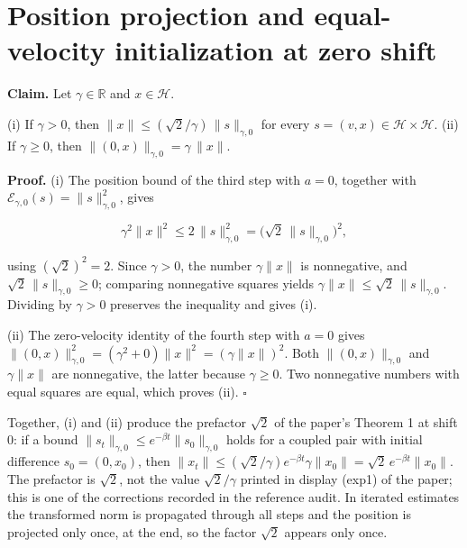 \documentclass[11pt,a4paper]{article}
\begin{document}
\section{\texorpdfstring{Position projection and equal-velocity initialization at zero shift}{Position projection and equal-velocity initialization at zero shift}}


\textbf{Claim.} Let \(\gamma\in\mathbb R\) and \(x\in \mathcal H\).




(i) If \(\gamma>0\), then \(\|x\|\le(\sqrt2/\gamma)\,\|s\|_{\gamma,0}\) for every \(s=(v,x)\in \mathcal H\times \mathcal H\).
(ii) If \(\gamma\ge0\), then \(\|(0,x)\|_{\gamma,0}=\gamma\,\|x\|\).




\textbf{Proof.} (i) The position bound of the third step with \(a=0\), together with \(\mathcal E_{\gamma,0}(s)=\|s\|_{\gamma,0}^2\), gives


\[\gamma^2\|x\|^2\le2\,\|s\|_{\gamma,0}^2=\bigl(\sqrt2\,\|s\|_{\gamma,0}\bigr)^2,\]


using \((\sqrt2)^2=2\). Since \(\gamma>0\), the number \(\gamma\|x\|\) is nonnegative, and \(\sqrt2\,\|s\|_{\gamma,0}\ge0\); comparing nonnegative squares yields \(\gamma\|x\|\le\sqrt2\,\|s\|_{\gamma,0}\). Dividing by \(\gamma>0\) preserves the inequality and gives (i).




(ii) The zero-velocity identity of the fourth step with \(a=0\) gives \(\|(0,x)\|_{\gamma,0}^2=(\gamma^2+0)\|x\|^2=(\gamma\|x\|)^2\). Both \(\|(0,x)\|_{\gamma,0}\) and \(\gamma\|x\|\) are nonnegative, the latter because \(\gamma\ge0\). Two nonnegative numbers with equal squares are equal, which proves (ii). \(\square\)




Together, (i) and (ii) produce the prefactor \(\sqrt2\) of the paper's Theorem 1 at shift \(0\): if a bound \(\|s_t\|_{\gamma,0}\le e^{-\beta t}\|s_0\|_{\gamma,0}\) holds for a coupled pair with initial difference \(s_0=(0,x_0)\), then \(\|x_t\|\le(\sqrt2/\gamma)e^{-\beta t}\gamma\|x_0\|=\sqrt2\,e^{-\beta t}\|x_0\|\). The prefactor is \(\sqrt2\), not the value \(\sqrt2/\gamma\) printed in display (exp1) of the paper; this is one of the corrections recorded in the reference audit. In iterated estimates the transformed norm is propagated through all steps and the position is projected only once, at the end, so the factor \(\sqrt2\) appears only once.
\end{document}
